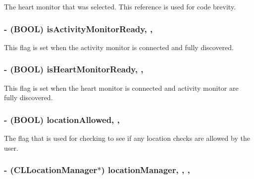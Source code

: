 The heart monitor that was selected. This reference is used for code brevity. \hypertarget{interface_device_poll_manager_aeab69bf0530fcf7d3f1b01c785e17bd2}{
\subsubsection[{is\-Activity\-Monitor\-Ready}]{\setlength{\rightskip}{0pt plus 5cm}-\/ (B\-O\-O\-L) is\-Activity\-Monitor\-Ready\hspace{0.3cm}{\ttfamily [read]}, {\ttfamily [write]}, {\ttfamily [atomic]}}}\label{interface_device_poll_manager_aeab69bf0530fcf7d3f1b01c785e17bd2}
This flag is set when the activity monitor is connected and fully discovered. \hypertarget{interface_device_poll_manager_a4735e7c0b634e8693ac8d33a0456d39f}{
\subsubsection[{is\-Heart\-Monitor\-Ready}]{\setlength{\rightskip}{0pt plus 5cm}-\/ (B\-O\-O\-L) is\-Heart\-Monitor\-Ready\hspace{0.3cm}{\ttfamily [read]}, {\ttfamily [write]}, {\ttfamily [atomic]}}}\label{interface_device_poll_manager_a4735e7c0b634e8693ac8d33a0456d39f}
This flag is set when the heart monitor is connected and activity monitor are fully discovered. \hypertarget{interface_device_poll_manager_a0e9aad6cc4f5a99aff27b0a64ae76d19}{
\subsubsection[{location\-Allowed}]{\setlength{\rightskip}{0pt plus 5cm}-\/ (B\-O\-O\-L) location\-Allowed\hspace{0.3cm}{\ttfamily [read]}, {\ttfamily [write]}, {\ttfamily [atomic]}}}\label{interface_device_poll_manager_a0e9aad6cc4f5a99aff27b0a64ae76d19}
The flag that is used for checking to see if any location checks are allowed by the user. \hypertarget{interface_device_poll_manager_ad710c38392bfc32d3509de470e0cfa8d}{
\subsubsection[{location\-Manager}]{\setlength{\rightskip}{0pt plus 5cm}-\/ (C\-L\-Location\-Manager$\ast$) location\-Manager\hspace{0.3cm}{\ttfamily [read]}, {\ttfamily [write]}, {\ttfamily [atomic]}, {\ttfamily [strong]}}}\label{interface_device_poll_manager_ad710c38392bfc32d3509de470e0cfa8d}
